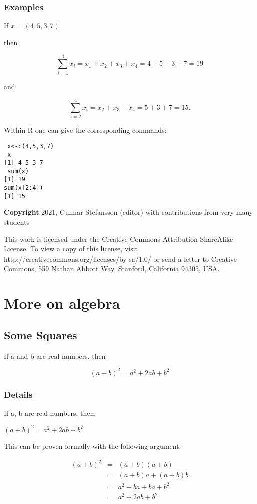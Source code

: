 \documentclass[12pt,a4paper]{article}
\theoremstyle{regla}
\theoremstyle{remark}
\theoremstyle{definition}
\theoremstyle{nonumberbreak}
\begin{document}
\subsubsection{Examples}
\begin{xmpl}
If $x=(4,5,3,7)$

then

$$\sum_{i=1}^{4} x_i = x_1+x_2+x_3+x_4 = 4+5+3+7 = 19
$$

and

$$
\sum_{i=2}^{4} x_i = x_2+x_3+x_4 = 5+3+7 = 15 .
$$

Within R one can give the corresponding commands:
\begin{lstlisting}
 x<-c(4,5,3,7)
 x
[1] 4 5 3 7
 sum(x)
[1] 19
sum(x[2:4])
[1] 15

\end{lstlisting}
\end{xmpl}

{\bf Copyright}
2021, Gunnar Stefansson (editor) with contributions from very many students

This work is licensed under the Creative Commons
Attribution-ShareAlike License. To view a copy of this license, visit
http://creativecommons.org/licenses/by-sa/1.0/ or send a letter to
Creative Commons, 559 Nathan Abbott Way, Stanford, California 94305,
USA.
\clearpage
\section{More on algebra}
\subsection{Some Squares}
\begin{fbox}
\begin{minipage}{0.97\textwidth}
If a and b are real numbers, then 

$$
(a+b)^2=a^2+2ab+b^2
$$
\end{minipage}
\end{fbox}
\subsubsection{Details}
If a, b are real numbers, then:

$(a+b)^2=a^2+2ab+b^2$

This can be proven formally with the following argument:

\begin{eqnarray*} 
(a+b)^2 &=& (a+b)(a+b)\\
       &=&( a+b)a+(a+b)b\\
       &=& a^2+ba+ba+b^2\\
       &=& a^2+2ab+b^2
\end{eqnarray*}
\end{document}
